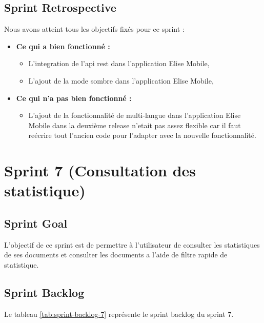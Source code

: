 \subsection{Sprint Retrospective}
Nous avons atteint tous les objectifs fixés pour ce sprint :
\begin{itemize}
  \item \textbf{Ce qui a bien fonctionné :}
  \begin{itemize}
    \item L'integration de l'api rest dans l'application Elise Mobile,
    \item L'ajout de la mode sombre dans l'application Elise Mobile,
  \end{itemize}

    \item \textbf{Ce qui n'a pas bien fonctionné :}
    \begin{itemize}
      \item L'ajout de la fonctionnalité de multi-langue dans l'application Elise Mobile dans la deuxième release n'etait pas assez flexible car il faut reécrire tout l'ancien code pour l'adapter avec la nouvelle fonctionnalité.
    \end{itemize}
      
\end{itemize}
\section{Sprint 7 (Consultation des statistique)}

\subsection{Sprint Goal}
L'objectif de ce sprint est de permettre à l'utilisateur de consulter les statistiques de ses documents et consulter les documents a l'aide de filtre rapide de statistique.

\subsection{Sprint Backlog}

Le tableau \ref{tab:sprint-backlog-7} représente le sprint backlog du sprint 7.

